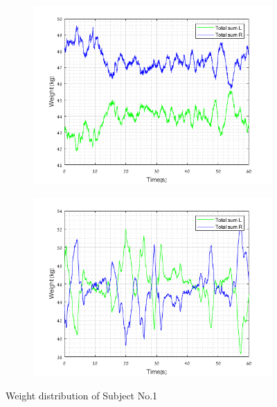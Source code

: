\documentclass[twoside]{ctuthesis}
\theoremstyle{plain}
\theoremstyle{definition}
\theoremstyle{note}
\begin{document}
\begin{figure}[H]
	\centering
	\begin{subfigure}{\textwidth}
		\hspace*{-1cm}
		\includegraphics[scale=.9]{W_sub1_OE}
	\end{subfigure}\hfil
	\begin{subfigure}{\textwidth}
		\hspace*{-1cm}
		\includegraphics[scale=.9]{W_sub1_CE}
	\end{subfigure}
	\caption{Weight distribution of Subject No.1}
\end{figure}
\end{document}
